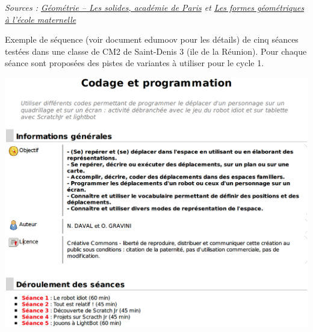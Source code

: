 \begin{exercice*}
\begin{description}
\begin{center}
      \end{center}
\end{description}
\hfill {\it Sources : \href{https://www.ac-paris.fr/serail/upload/docs/application/pdf/2014-06/geometrie_3_-_les_solides.pdf}{Géométrie -- Les solides, académie de Paris} et \href{http://ww2.ac-poitiers.fr/dsden16-pedagogie/sites/dsden16-pedagogie/IMG/pdf/formes_geometriques_a_l_ecole_maternelle.pdf}{Les formes géométriques à l'école maternelle}}
\end{exercice*}


\begin{exercice*}
Exemple de séquence (voir document edumoov pour les détails) de cinq séances \og testées \fg{} dans une classe de CM2 de Saint-Denis 3 (ile de la Réunion). Pour chaque séance sont proposées des pistes de variantes à utiliser pour le cycle 1.

\begin{center}
   \includegraphics[width=16cm]{Geometrie_did/Images/Geo6_activites_edumoov_0}
\end{center}


\end{exercice*}
